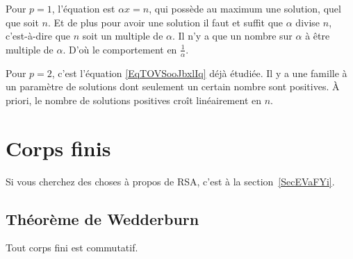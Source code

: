 \begin{example}
    Pour \( p=1\), l'équation est \( \alpha x=n\), qui possède au maximum une solution, quel que soit \( n\). Et de plus pour avoir une solution il faut et suffit que \( \alpha\) divise \( n\), c'est-à-dire que \( n\) soit un multiple de \( \alpha\). Il n'y a que un nombre sur \( \alpha\) à être multiple de \( \alpha\). D'où le comportement en \( \frac{1}{ \alpha }\).

    Pour \( p=2\), c'est l'équation \eqref{EqTOVSooJbxlIq} déjà étudiée. Il y a une famille à un paramètre de solutions dont seulement un certain nombre sont positives. À priori, le nombre de solutions positives croît linéairement en \( n\).
\end{example}

\section{Corps finis}
\label{SecCorpsFinizkAcbS}

Si vous cherchez des choses à propos de RSA, c'est à la section~\ref{SecEVaFYi}.

\subsection{Théorème de Wedderburn}

\begin{theorem}    \label{ThoMncIWA}
    Tout corps fini est commutatif.
\end{theorem}

